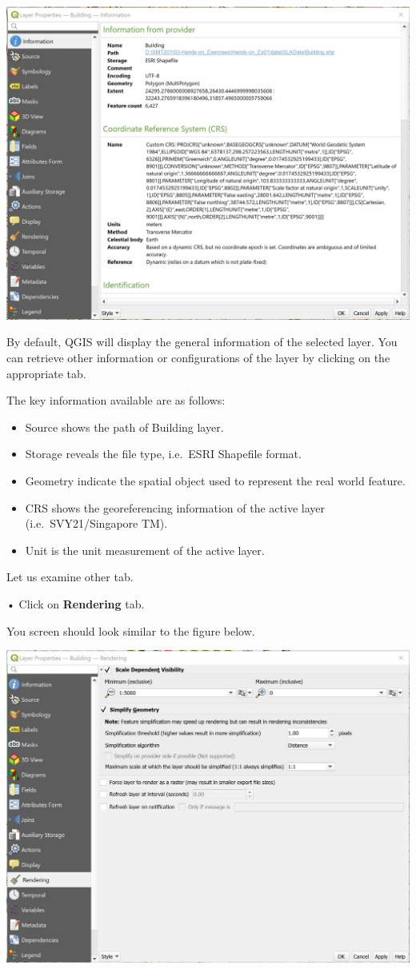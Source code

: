 \documentclass[
  letterpaper,
  DIV=11,
  numbers=noendperiod]{scrreprt}
\providecommand{\tightlist}{%
  \setlength{\itemsep}{0pt}\setlength{\parskip}{0pt}}\usepackage{longtable,booktabs,array}
\begin{document}
\includegraphics{./img/image1-18.jpg}

By default, QGIS will display the general information of the selected
layer. You can retrieve other information or configurations of the layer
by clicking on the appropriate tab.

The key information available are as follows:

\begin{itemize}
\tightlist
\item
  Source shows the path of Building layer.
\item
  Storage reveals the file type, i.e.~ESRI Shapefile format.
\item
  Geometry indicate the spatial object used to represent the real world
  feature.\\
\item
  CRS shows the georeferencing information of the active layer
  (i.e.~SVY21/Singapore TM).
\item
  Unit is the unit measurement of the active layer.
\end{itemize}

Let us examine other tab.

• Click on \textbf{Rendering} tab.

You screen should look similar to the figure below.

\includegraphics{./img/image1-19.jpg}
\end{document}
